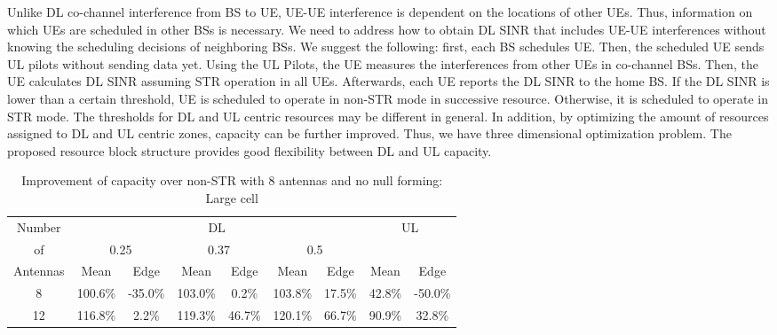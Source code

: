 \documentclass[twocolumn]{IEEEtran}
\begin{document}
Unlike DL co-channel interference from BS to UE, UE-UE interference
is dependent on the locations of other UEs. Thus, information on
which UEs are scheduled in other BSs is necessary. We need to
address how to obtain DL SINR that includes UE-UE interferences
without knowing the scheduling decisions of neighboring BSs. We
suggest the following: first, each BS schedules UE. Then, the
scheduled UE sends UL pilots without sending data yet. Using the UL
Pilots, the UE measures the interferences from other UEs in
co-channel BSs. Then, the UE calculates DL SINR assuming STR
operation in all UEs. Afterwards, each UE reports the DL SINR to the
home BS. If the DL SINR is lower than a certain threshold, UE is
scheduled to operate in non-STR mode in successive resource.
Otherwise, it is scheduled to operate in STR mode. The thresholds
for DL and UL centric resources may be different in general. In
addition, by optimizing the amount of resources assigned to DL and
UL centric zones, capacity can be further improved. Thus, we have
three dimensional optimization problem. The proposed resource block
structure provides good flexibility between DL and UL capacity.

\begin{center}
\begin{table*}[ht]
\centering \caption{Improvement of capacity over non-STR with 8
antennas and no null forming: Large cell}
\begin{small}
\begin{tabular}{c||c|c|c|c|c|c||c|c}
\hline
  \hline
Number &\multicolumn{6}{c||}{DL}  &\multicolumn{2}{c}{UL}  \\
    \cline{2-9}
 of  & \multicolumn{2}{c|}{0.25} & \multicolumn{2}{c|}{0.37} & \multicolumn{2}{c||}{0.5} & \multicolumn{2}{c}{}  \\
\cline{2-9}
 Antennas & Mean & Edge & Mean & Edge & Mean & Edge & Mean & Edge\\
  \hline
  \hline
  8 & 100.6\% &-35.0\% & 103.0\% & 0.2\% & 103.8\% & 17.5\% & 42.8\% &-50.0\% \\
 12 & 116.8\% &  2.2\% & 119.3\% & 46.7\%& 120.1\% & 66.7\% & 90.9\% & 32.8\%   \\
\hline \hline
\end{tabular}
\end{small}
\end{table*}
\end{center}
\end{document}
